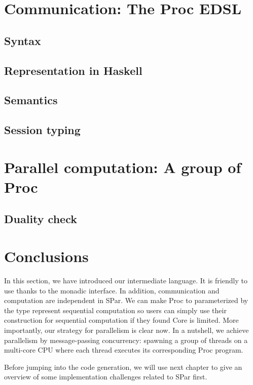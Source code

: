 \section{Communication: The Proc EDSL}
\subsection{Syntax}
\subsection{Representation in Haskell}
\subsection{Semantics}
\subsection{Session typing}
\section{Parallel computation: A group of Proc}
\subsection{Duality check}
\section{Conclusions}
In this section, we have introduced our intermediate language. It is friendly to use thanks to the monadic interface. In addition, communication and computation are independent in SPar. We can make Proc to parameterized by the type represent sequential computation so users can simply use their construction for sequential computation if they found Core is limited. More importantly, our strategy for parallelism is clear now. In a nutshell, we achieve parallelism by message-passing concurrency: spawning a group of threads on a multi-core CPU where each thread executes its corresponding Proc program.

Before jumping into the code generation, we will use next chapter to give an overview of some implementation challenges related to SPar first.